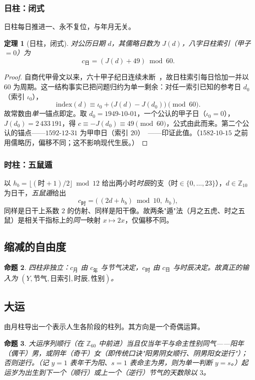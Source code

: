 \documentclass[11pt,a4paper,fontset=none]{ctexart}
\newtheorem{theorem}{定理}[section]
\newtheorem{proposition}[theorem]{命题}
\theoremstyle{definition}
\theoremstyle{remark}
\newcommand{\Z}{\mathbb{Z}}
\begin{document}
\subsubsection*{日柱：闭式}
日柱每日推进一、永不复位，与年月无关。
\begin{theorem}[日柱，闭式]\label{thm:daypillar}
对公历日期 $d$，其儒略日数为 $J(d)$，八字日柱索引（甲子$=0$）为
\[
c_{\text{日}}=(J(d)+49)\bmod 60.
\]
\end{theorem}
\begin{proof}
自商代甲骨文以来，六十甲子纪日连续未断~\cite{needham1959}，故日柱索引每日恰加一并以 $60$ 为周期。这一结构事实已把问题归约为单一剩余：对任一索引已知的参考日 $d_0$（索引 $\iota_0$），
\[
\mathrm{index}(d)\equiv \iota_0+\big(J(d)-J(d_0)\big)\pmod{60}.
\]
故常数由\emph{单一}锚点即定。取 $d_0=1949\text{-}10\text{-}01$，一个公认的甲子日（$\iota_0=0$），$J(d_0)=2\,433\,191$，得 $c\equiv -J(d_0)\equiv 49\pmod{60}$，公式由此而来。第二个公认的锚点——$1592$-$12$-$31$ 为甲申日（索引 $20$）~\cite{chenshu}——印证此值。（$1582$-$10$-$15$ 之前用儒略历，偏移不同；这不影响现代生辰。）
\end{proof}

\subsubsection*{时柱：五鼠遁}
以 $h_b=\big\lfloor(\text{时}+1)/2\big\rfloor\bmod 12$ 给出两小时\emph{时辰}的支（时$\in\{0,\dots,23\}$），$d\in\Z_{10}$ 为日干，\emph{五鼠遁}给出
\[
c_{\text{时}}=\big(\,(2d+h_b)\bmod 10,\;h_b\,\big),
\]
同样是日干上系数 $2$ 的仿射、同样是阳干像。故两条"遁"法（月之五虎、时之五鼠）是相关干指标上的\emph{同一}映射 $x\mapsto 2x$，仅偏移不同。

\subsection{缩减的自由度}
\begin{proposition}\label{prop:dof}
四柱非独立：$c_{\text{月}}$ 由 $c_{\text{年}}$ 与节气决定，$c_{\text{时}}$ 由 $c_{\text{日}}$ 与时辰决定。故真正的输入为 $(Y,\text{节气},\text{日索引},\text{时辰},\text{性别})$。
\end{proposition}

\subsection{大运}
由月柱导出一个表示人生各阶段的柱列。其方向是一个奇偶运算。
\begin{proposition}\label{prop:dayun}
大运序列顺行（在 $\Z_{60}$ 中前进）当且仅当年干与命主性别同气——阳年（偶干）男，或阴年（奇干）女（即传统口诀"阳男阴女顺行、阴男阳女逆行"）；否则逆行。（记 $y=1$ 表年干为阳、$s=1$ 表命主为男，则为单一判断 $y=s$。）起运岁为出生到下一个（顺行）或上一个（逆行）节气的天数除以 $3$。
\end{proposition}
\end{document}
